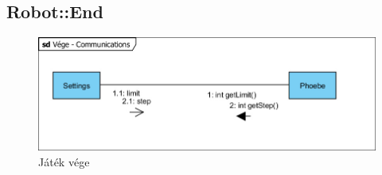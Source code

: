 \subsection{Robot::End}
\begin{figure}[h]
\begin{center}
\includegraphics[width=17cm]{images/Commdiagrams/Comm_End.jpg}
\caption{Játék vége}
\label{fig:example11}
\end{center}
\end{figure}
\pagebreak